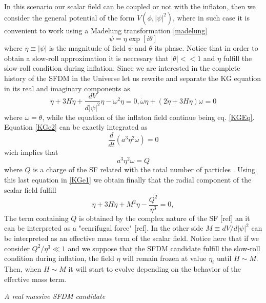 \documentclass[amssymb,twocolumn,prd,nofootinbib,showpacs]{revtex4-1}
\begin{document}
In this scenario our scalar field can be coupled or not with the inflaton, then we consider the general potential of the form $V(\phi,|\psi|^2)$, where in such case it is convenient to work using a Madelung transformation \eqref{madelung}
\begin{equation}
\psi = \eta \exp[i\theta]
\end{equation}
where $\eta\equiv |\psi|$ is the magnitude of field $\psi$ and $\theta$ its phase. Notice that in order to obtain a slow-roll approximation it is neccesary that $|\theta|<<1$ and $\eta$ fulfill the slow-roll condition during inflation. Since we are interested in the complete history of the SFDM in the Universe let us rewrite and separate the KG equation in its real and imaginary components as
\begin{subequations}\label{KESFDM}
\begin{equation}\label{KGe1}
\ddot\eta+3H\dot\eta+\frac{dV}{d|\psi|^2}\eta-\omega^2\eta= 0,
\end{equation}
\begin{equation}\label{KGe2}
\dot\omega \eta + (2\dot\eta+3H\eta)\omega=0
\end{equation}
\end{subequations}
where $\omega = \dot \theta$, while the equation of the inflaton field continue being eq. \eqref{KGEq}. Equation \eqref{KGe2} can be exactly integrated as
\begin{equation}
\frac{d}{dt}\left(a^3\eta^2\omega\right)=0
\end{equation}
wich implies that 
\begin{equation}
a^3\eta^2\omega=Q
\end{equation}
where $Q$ is a charge of the SF related with the total number of particles \cite{SFphi42,charge1,charge2,charge3,charge4}. Using this last equation in \eqref{KGe1} we obtain finally
that the radial component of the scalar field fulfill
\begin{equation}\label{KGe3}
\ddot\eta+3H\dot\eta+M^2\eta-\frac{Q^2}{\eta^3}= 0,
\end{equation}
The term containing $Q$ is obtained by the complex nature of the SF [ref] an it can be interpreted as a "cenrifugal force" [ref]. In the other side $M\equiv dV/d|\psi|^2$ can be interpreted as an effective mass term of the scalar field. Notice here that if we consider $Q^2/\eta^3\ll 1$ and we suppose that the SFDM candidate fulfill the slow-roll condition during inflation, the field $\eta$ will remain frozen at value $\eta_i$ until $H\sim M$. Then, when $H\sim M$ it will start to evolve depending on the behavior of the effective mass term.
\begin{center}
\textit{A real massive SFDM candidate}
\end{center}
\end{document}
